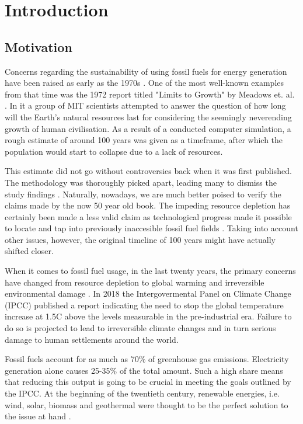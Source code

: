 \section{Introduction}


\subsection{Motivation}
  Concerns regarding the sustainability of using fossil fuels for energy generation
  have been raised as early as the 1970s \cite{rethinking_resource_depletion}. 
  One of the most well-known examples from that time was the 1972 report
  titled "Limits to Growth" by Meadows et. al. \cite{limits_to_growth}.
  In it a group of MIT scientists attempted to answer the question of
  how long will the Earth's natural resources last for
  considering the seemingly neverending growth of human civilisation.
  As a result of a conducted computer simulation,
  a rough estimate of around 100 years was given as a timeframe,
  after which the population would start to collapse due to a lack of resources.


  This estimate did not go without controversies back when it was first published.
  The methodology was thoroughly picked apart,
  leading many to dismiss the study findings
  \cite{rethinking_resource_depletion}.
  Naturally, nowadays, we are much better poised to verify
  the claims made by the now 50 year old book. The impeding resource depletion
  has certainly been made a less valid claim as technological progress
  made it possible to locate and tap into
  previously inaccesible fossil fuel fields
  \cite{shaping_the_global_oil_peak}.
  Taking into account other issues, however, 
  the original timeline of 100 years might have
  actually shifted closer. 


  When it comes to fossil fuel usage, in the last twenty years, 
  the primary concerns have changed from resource depletion to global warming 
  and irreversible environmental damage \cite{rethinking_resource_depletion}.
  In 2018 the Intergovermental Panel on Climate Change (IPCC) published a
  report indicating the need to stop the global temperature increase 
  at 1.5\degree C above the levels measurable in the pre-industrial era.
  Failure to do so is projected to lead to irreversible climate changes
  and in turn serious damage to human settlements around the world.
  \cite{ipcc2018}


  Fossil fuels account for as much as 70\% of greenhouse gas emissions.
  Electricity generation alone causes 25-35\% 
  \cite{global_climate_change} of the total amount.
  Such a high share means that reducing this output
  is going to be crucial in meeting the goals outlined by the IPCC.
  At the beginning of the twentieth century, renewable energies, i.e. 
  wind, solar, biomass and geothermal were thought
  to be the perfect solution to the issue at hand
  \cite{renewable_review_2000}. 


